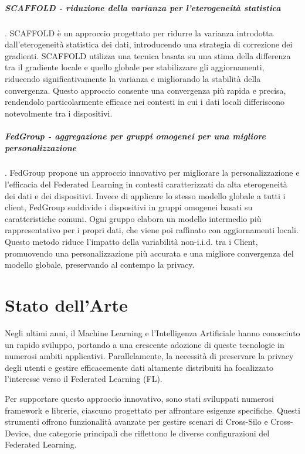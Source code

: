 \documentclass[a4paper, oneside, openright]{report}
\begin{document}
\paragraph{SCAFFOLD - riduzione della varianza per l'eterogeneità statistica}.
SCAFFOLD \cite{DBLP:journals/corr/abs-1910-06378} è un approccio progettato per ridurre la varianza introdotta dall'eterogeneità statistica dei dati, introducendo una strategia di correzione dei gradienti. SCAFFOLD utilizza una tecnica basata su una stima della differenza tra il gradiente locale e quello globale per stabilizzare gli aggiornamenti, riducendo significativamente la varianza e migliorando la stabilità della convergenza. Questo approccio consente una convergenza più rapida e precisa, rendendolo particolarmente efficace nei contesti in cui i dati locali differiscono notevolmente tra i dispositivi.

\paragraph{FedGroup - aggregazione per gruppi omogenei per una migliore personalizzazione}.
FedGroup \cite{9644782} propone un approccio innovativo per migliorare la personalizzazione e l’efficacia del Federated Learning in contesti caratterizzati da alta eterogeneità dei dati e dei dispositivi. Invece di applicare lo stesso modello globale a tutti i client, FedGroup suddivide i dispositivi in gruppi omogenei basati su caratteristiche comuni. Ogni gruppo elabora un modello intermedio più rappresentativo per i propri dati, che viene poi raffinato con aggiornamenti locali. Questo metodo riduce l’impatto della variabilità non-i.i.d. tra i Client, promuovendo una personalizzazione più accurata e una migliore convergenza del modello globale, preservando al contempo la privacy.
\clearpage{}
\clearpage{}\chapter{Stato dell'Arte}\label{chap:sota}

Negli ultimi anni, il Machine Learning e l'Intelligenza Artificiale hanno conosciuto un rapido sviluppo, portando a una crescente adozione di queste tecnologie in numerosi ambiti applicativi. Parallelamente, la necessità di preservare la privacy degli utenti e gestire efficacemente dati altamente distribuiti ha focalizzato l'interesse verso il Federated Learning (FL).

Per supportare questo approccio innovativo, sono stati sviluppati numerosi framework e librerie, ciascuno progettato per affrontare esigenze specifiche. Questi strumenti offrono funzionalità avanzate per gestire scenari di Cross-Silo e Cross-Device, due categorie principali che riflettono le diverse configurazioni del Federated Learning.
\end{document}
